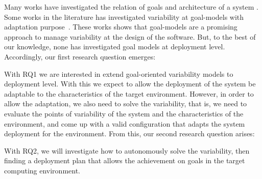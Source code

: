

Many works have investigated the relation of goals and architecture of a system \cite{van_lamsweerde_system_2003}\citep{penserini_design_2007}\cite{kramer_self-managed_2007}\cite{morandini_towards_2008}\cite{pimentel_deriving_2012}.
Some works in the literature has investigated variability at goal-models with adaptation purpose~\cite{yu_goals_2008}\cite{angelopoulos_capturing_2015}. These works shows that goal-models are a promising approach to manage variability at the design of the software. But, to the best of our knowledge, none has investigated goal models at deployment level.
Accordingly, our first research question emerges:

\bigskip
 \setlength{\fboxsep}{12pt}
 \noindent{}\bigskip

With RQ1 we are interested in extend goal-oriented variability models to deployment level. With this we expect to allow the deployment of the system be adaptable to the characteristics of the target environment. However, in order to allow the adaptation, we also need to solve the variability, that is, we need to evaluate the points of variability of the system and the characteristics of the environment, and come up with a valid configuration that adapts the system deployment for the environment. From this, our second research question arises:

\bigskip
\setlength{\fboxsep}{10pt}
\noindent{}\bigskip

With RQ2, we will investigate how to autonomously solve the variability, then finding a deployment plan that allows the achievement on goals in the target computing environment.






